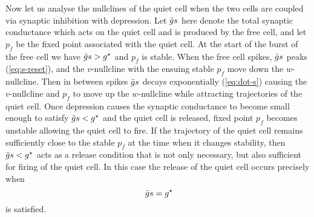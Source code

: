 \documentclass[../manuscript.tex]{subfiles}
\begin{document}

Now let us analyse the nullclines of the quiet cell when the two cells are coupled via synaptic inhibition with depression.
Let $\bar g s$ here denote the total synaptic conductance which acts on the quiet cell and is produced by the free cell, and let $p_{f}$ be the fixed point associated with the quiet cell.
At the start of the burst of the free cell we have $\bar g s > g^{\star}$ and $p_{f}$ is stable.
When the free cell spikes, $\bar g s$ peaks (\cref{eq:s-reset}), and the $v$-nullcline with the ensuing stable $p_f$ move down the $w$-nullcline.
Then in between spikes $\bar g s$ decays exponentially (\cref{eq:dot-s}) causing the $v$-nullcline and $p_{f}$ to move up the $w$-nullcline while attracting trajectories of the quiet cell.
Once depression causes the synaptic conductance to become small enough to satisfy $\bar g s<g^{\star}$ and the quiet cell is released, fixed point $p_{f}$ becomes unstable allowing the quiet cell to fire.
If the trajectory of the quiet cell remains sufficiently close to the stable $p_{f}$ at the time when it changes stability, then $\bar g s < g^{\star}$ acts as a release condition that is not only necessary, but also sufficient for firing of the quiet cell.
In this case the release of the quiet cell occurs precisely when
\begin{equation}
  ~\label{eq:release}
  \bar g s=g^{\star}
\end{equation}
is satisfied.
\end{document}
